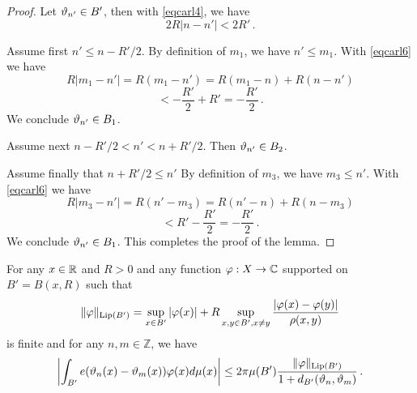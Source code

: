 {\begin{proof}
Let ${\vartheta}_{n'}\in B'$, then with \eqref{eqcarl4},
we have
\begin{equation}\label{eqcarl6}
    2R|n-n'|< 2R'\, .
\end{equation}

Assume first $n'\le n-R'/2$. By definition of $m_1$,
we have $n'\le m_1$.  With \eqref{eqcarl6}
we have
\begin{equation*}
    R|m_1-n'|=R(m_1-n')=R(m_1-n)+R(n-n')
\end{equation*}
\begin{equation}
    < -\frac{R'}2+R'=-\frac{R'}2\, .
\end{equation}
We conclude ${\vartheta}_{n'}\in B_1$.

Assume next  $n-R'/2<n'<n+R'/2$. Then
${\vartheta}_{n'}\in B_2$.

Assume finally that $n+R'/2\le n'$
By definition of $m_3$,
we have $m_3\le n'$.  With \eqref{eqcarl6}
we have
\begin{equation*}
    R|m_3-n'|=R(n'-m_3)=R(n'-n)+R(n-m_3)
\end{equation*}
\begin{equation}
    < R' -\frac{R'}2=-\frac{R'}2\, .
\end{equation}
We conclude ${\vartheta}_{n'}\in B_1$.
This completes the proof of the lemma.
\end{proof}


\begin{lemma}
\label{real-van-der-Corput}
    For any $x\in {\mathbb{R}}$ and $R>0$ and any
    function $\varphi: X\to {\mathbb{C}}$ supported on $B'=B(x,R)$
    such that
\begin{equation}
    \|\varphi\|_{\operatorname{\operatorname{Lip}}(B')} = \sup_{x \in B'} |\varphi(x)| + R \sup_{x,y \in B', x \neq y} \frac{|\varphi(x) - \varphi(y)|}{\rho(x,y)}
\end{equation}
is finite and for any $n,m\in \mathbb{Z}$, we have
\begin{equation}
    \label{eq-vdc-cond1}
    \left|\int_{B'} e({\vartheta}_n(x)-{{\vartheta}_m(x)}) \varphi(x) d\mu(x)\right|\le 2\pi \mu(B')\frac{\|\varphi\|_{\operatorname{\operatorname{Lip}}(B')}}{1+d_{B'}({\vartheta}_n,{\vartheta}_m)}
\, .
\end{equation}



\end{lemma}}

